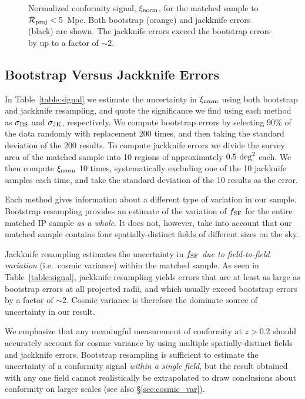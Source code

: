 \begin{figure}
  \epstrim{0.3in 0.1in 0.2in 0.3in}
  \caption{Normalized conformity signal, $\signorm$, for the matched sample to ${\mathcal{R}_{\text{proj}}<5}$~Mpc.  Both bootstrap (orange) and jackknife errors (black) are shown.  The jackknife errors exceed the bootstrap errors by up to a factor of $\sim2$.
}
  \label{fig:normsig_matched}
\end{figure}


\subsection{Bootstrap Versus Jackknife Errors}\label{sec:errors}

In Table~\ref{table:signal} we estimate the uncertainty in $\signorm$ using both bootstrap and jackknife resampling, and quote the significance we find using each 
method as $\sigmaBS$ and $\sigmaJK$, respectively.
We compute bootstrap errors by selecting 90\% of the data randomly with replacement 200 times, and then taking the standard deviation of the 200 results.
To compute jackknife errors we divide the survey area of the matched sample into 10 regions of approximately $0.5~\degsq$ each.
We then compute $\signorm$ 10 times, systematically excluding one of the 10 jackknife samples each time, and take the standard deviation of the 10 results as the error.

Each method gives information about a different type of variation in our sample.
Bootstrap resampling provides an estimate of the variation of $\flate$ for the entire matched IP sample \emph{as a whole}.
It does not, however, take into account that our matched sample contains four spatially-distinct fields of different sizes on the sky.

Jackknife resampling estimates the uncertainty in $\flate$ \emph{due to field-to-field variation} (i.e.~cosmic variance) within the matched sample.
As seen in Table~\ref{table:signal}, jackknife resampling yields errors that are at least as large as bootstrap errors at all projected radii,
and which usually exceed bootstrap errors by a factor of $\sim2$.
Cosmic variance is therefore the dominate source of uncertainty in our result.

We emphasize that any meaningful measurement of conformity at $z>0.2$ should accurately account for cosmic variance by using multiple spatially-distinct fields and jackknife errors.
Bootstrap resampling is sufficient to estimate the uncertainty of a conformity signal \emph{within a single field}, but the result obtained with any one field cannot
realistically be extrapolated to draw conclusions about conformity on larger scales (see also \S\ref{sec:cosmic_var}).

